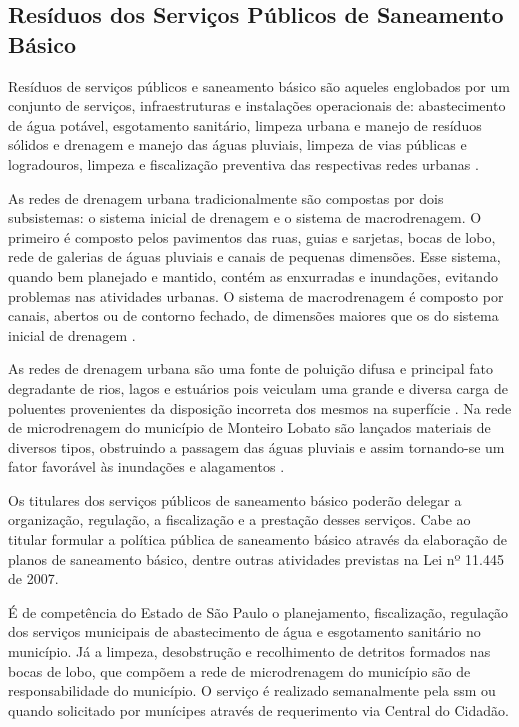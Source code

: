 

\subsection{Resíduos dos Serviços Públicos de Saneamento Básico}

Resíduos de serviços públicos e saneamento básico são aqueles englobados por um conjunto de serviços, infraestruturas e instalações operacionais de: abastecimento de água potável, esgotamento sanitário, limpeza urbana e manejo de resíduos sólidos e drenagem e manejo das águas pluviais, limpeza de vias públicas e logradouros, limpeza e fiscalização preventiva das respectivas redes urbanas \cite{brasil:12305}.  

As redes de drenagem urbana tradicionalmente são compostas por dois subsistemas: o sistema inicial de drenagem e o sistema de macrodrenagem. O primeiro é composto pelos pavimentos das ruas, guias e sarjetas, bocas de lobo, rede de galerias de águas pluviais e canais de pequenas dimensões. Esse sistema, quando bem planejado e mantido, contém as enxurradas e inundações, evitando problemas nas atividades urbanas. O sistema de macrodrenagem é composto por canais, abertos ou de contorno fechado, de dimensões maiores que os do sistema inicial de drenagem \cite{Ramos:1999}.

As redes de drenagem urbana são uma fonte de poluição difusa e principal fato degradante de rios, lagos e estuários pois veiculam uma grande e diversa carga de poluentes provenientes da disposição incorreta dos mesmos na superfície \cite{Brites2004}. Na rede de microdrenagem do município de Monteiro Lobato são lançados materiais de diversos tipos, obstruindo a passagem das águas pluviais e assim tornando-se um fator favorável às inundações e alagamentos \cite{MonteiroLobato}.

Os titulares dos serviços públicos de saneamento básico poderão delegar a organização, regulação, a fiscalização e a prestação desses serviços. Cabe ao titular formular a política pública de saneamento básico através da elaboração de planos de saneamento básico, dentre outras atividades previstas na Lei nº 11.445 de 2007.

É de competência do Estado de São Paulo o planejamento, fiscalização, regulação dos serviços municipais de abastecimento de água e esgotamento sanitário no município. Já a limpeza, desobstrução e recolhimento de detritos formados nas bocas de lobo, que compõem a rede de microdrenagem do município são de responsabilidade do município. O serviço é realizado semanalmente pela \gls{ssm} ou quando solicitado por munícipes através de requerimento via Central do Cidadão.

